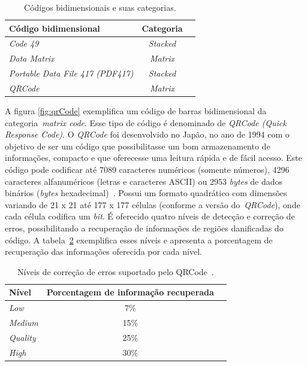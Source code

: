 	
	\begin{table} %
		\centering
		\caption{Códigos bidimensionais e suas categorias.}
		\begin{tabular}{lcc} 
			\hline %
			\textbf{Código bidimensional} & \textbf{Categoria} \\ 
			\hline
			\hline
			\textit{Code 49} & \textit{Stacked} \\
			\textit{Data Matrix} & \textit{\textit{Matrix}} \\
			\textit{Portable Data File 417 (PDF417)} & \textit{Stacked}  \\
			\textit{QRCode} & \textit{\textit{Matrix}}\\
			\hline
		\end{tabular}
		\label{tab:exemplo}
	\end{table}
	
	A figura \ref{fig:qrCode} exemplifica um código de barras bidimensional da 
	categoria~\textit{matrix code}. Esse tipo de código é denominado de \textit{QRCode (Quick Response Code)}. 
	O \textit{QRCode} foi desenvolvido no Japão, no ano de 1994 com o objetivo de ser um código que possibilitasse um
	bom armazenamento de informações, compacto e que oferecesse uma leitura rápida e de fácil acesso.
	Este código pode codificar até 7089 caracteres numéricos (somente números), 4296 caracteres alfanuméricos 
	(letras e caracteres ASCII) ou 2953 \textit{bytes} de dados binários (\textit{bytes} hexadecimal)~\cite{kato}. Possui um 
	formato quadrático com dimensões variando
	de 21 x 21 até 177 x 177 células (conforme a versão do~\textit{QRCode}), onde cada célula codifica
	um \textit{bit}. É oferecido quatro níveis de detecção e correção de erros, possibilitando a
	recuperação de informações de regiões danificadas do código. A tabela~\ref{tab:nivelFalha}
	exemplifica esses níveis e apresenta a porcentagem de recuperação das informações oferecida por
	cada nível.
	
	
	\begin{table}
		\centering
		\caption{Níveis de correção de erros suportado pelo QRCode~\cite{kato}.}
		\begin{tabular}{lcc} 
			\hline
			 \textbf{Nível} & \textbf{Porcentagem de informação recuperada} \\
			\hline
			\hline
			\textit{Low} & 7\% \\
			\textit{Medium} & 15\% \\
			\textit{Quality} & 25\% \\
			\textit{High} & 30\% \\
			\hline
		\end{tabular}
		\label{tab:nivelFalha}
	\end{table}
	
